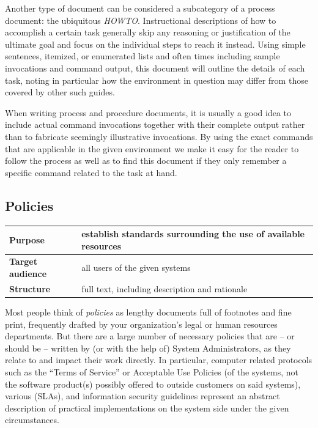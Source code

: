 Another type of document can be considered a
subcategory of a process document: the ubiquitous {\em
HOWTO}.  Instructional descriptions of
how to accomplish a certain task generally skip any
reasoning or justification of the ultimate goal and
focus on the individual steps to reach it instead.
Using simple sentences, itemized, or enumerated lists
and often times including sample invocations and
command output, this document will outline the details
of each task, noting in particular how the environment
in question may differ from those covered by other
such guides.

When writing process and procedure documents, it is
usually a good idea to include actual command
invocations together with their complete output rather
than to fabricate seemingly illustrative invocations.
By using the exact commands that are applicable in the
given environment we make it easy for the reader to
follow the process as well as to find this document if
they only remember a specific command related to the
task at hand.


\subsection{Policies}
\label{documentation:types:policies}

\vspace{.25in}
\begin{tabular}[ht]{ l p{}}
	\hline
	{\bf Purpose} & establish standards surrounding the use of available resources \\
	\hline
	{\bf Target audience} & all users of the given systems \\
	\hline
	{\bf Structure} & full text, including description and rationale \\
	\hline
\end{tabular}
\vspace{.25in}

Most people think of {\em policies} as lengthy
documents full of footnotes and fine print, frequently
drafted by your organization's legal or human
resources departments.  But there are a large number
of necessary policies that are -- or should be --
written by (or with the help of) System
Administrators, as they relate to and impact their
work directly.  In particular, computer related
protocols such as the ``Terms of Service'' or Acceptable Use
Policies (of the
systems, not the software product(s) possibly offered
to outside customers on said systems), various
 (SLAs), and information security
guidelines represent an abstract description of
practical implementations on the system side under the
given circumstances.

